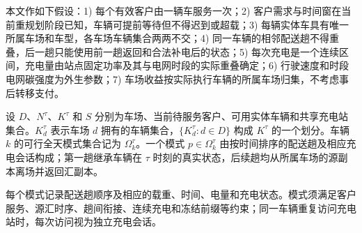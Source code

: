\documentclass{setp-new}
\begin{document}
本文作如下假设：1) 每个有效客户由一辆车服务一次；2) 客户需求与时间窗在当前重规划阶段已知，车辆可提前等待但不得迟到或超载；3) 每辆实体车具有唯一所属车场和车型，各车场车辆集合两两不交；4) 同一车辆的相邻配送趟不得重叠，后一趟只能使用前一趟返回和合法补电后的状态；5) 每次充电是一个连续区间，充电量由站点固定功率及其与电网时段的实际重叠确定；6) 行驶速度和时段电网碳强度为外生参数；7) 车场收益按实际执行车辆的所属车场归集，不考虑事后转移支付。

设 $D$、$N^\tau$、$K^\tau$ 和 $S$ 分别为车场、当前待服务客户、可用实体车辆和共享充电站集合。$K_d^\tau$ 表示车场 $d$ 拥有的车辆集合，$\{K_d^\tau:d\in D\}$ 构成 $K^\tau$ 的一个划分。车辆 $k$ 的可行全天模式集合记为 $\Omega_k^\tau$。一个模式 $p\in\Omega_k^\tau$ 由按时间排序的配送趟及相应充电会话构成；第一趟继承车辆在 $\tau$ 时刻的真实状态，后续趟均从所属车场的源副本离场并返回汇副本。

每个模式记录配送趟顺序及相应的载重、时间、电量和充电状态。模式须满足客户服务、源汇时序、趟间衔接、连续充电和冻结前缀等约束；同一车辆重复访问充电站时，每次访问视为独立充电会话。
\end{document}

